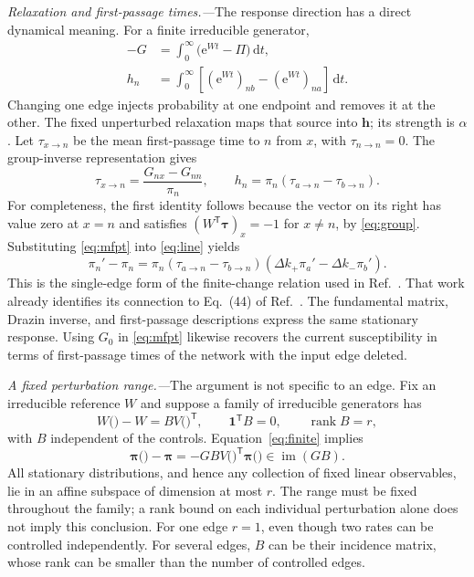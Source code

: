 \documentclass[
  reprint,
  superscriptaddress,
  amsmath,
  amssymb,
  aps,
  pre,
  longbibliography
]{revtex4-2}
\def\theta{}%
\newcommand{\me}{\mathrm{e}}
\newcommand{\dd}{\mathrm{d}}
\begin{document}
\textit{Relaxation and first-passage times.---}The response direction
has a direct dynamical meaning. For a finite irreducible generator,
\begin{equation}
 \begin{split}
 -G&=\int_0^\infty\!\bigl(\me^{Wt}-\Pi\bigr)\,\dd t,\\
 h_n&=\int_0^\infty\!\left[
 (\me^{Wt})_{nb}-(\me^{Wt})_{na}\right]\,\dd t.
 \end{split}
 \label{eq:relaxation}
\end{equation}
Changing one edge injects probability at one endpoint and removes it
at the other. The fixed unperturbed relaxation maps that source into
$\bm h$; its strength is $\alpha$.
Let $\tau_{x\to n}$ be the mean first-passage time to $n$ from $x$,
with $\tau_{n\to n}=0$. The group-inverse representation
\cite{Meyer1975} gives
\begin{equation}
 \tau_{x\to n}=\frac{G_{nx}-G_{nn}}{\pi_n},\qquad
 h_n=\pi_n(\tau_{a\to n}-\tau_{b\to n}).
 \label{eq:mfpt}
\end{equation}
For completeness, the first identity follows because the vector on its
right has value zero at $x=n$ and satisfies
$(W^{\mathsf T}\bm\tau)_x=-1$ for $x\ne n$, by \cref{eq:group}.
Substituting \cref{eq:mfpt} into \cref{eq:line} yields
\begin{equation}
 \pi_n'-\pi_n
 =\pi_n(\tau_{a\to n}-\tau_{b\to n})
       (\Delta k_+\pi_a'-\Delta k_-\pi_b').
 \label{eq:mfpt-response}
\end{equation}
This is the single-edge form of the finite-change relation used in
Ref.~\cite{Khodabandehlou2025}. That work already identifies its
connection to Eq.~(44) of Ref.~\cite{Harvey2023}. The fundamental
matrix, Drazin inverse, and first-passage descriptions express the same
stationary response. Using $G_0$ in \cref{eq:mfpt} likewise recovers
the current susceptibility in terms of first-passage times of the
network with the input edge deleted.

\textit{A fixed perturbation range.---}The argument is not specific to
an edge. Fix an irreducible reference $W$ and suppose a family of
irreducible generators has
\begin{equation}
 W(\bm\theta)-W=B V(\bm\theta)^{\mathsf T},\qquad
 \bm 1^{\mathsf T}B=0,\qquad \operatorname{rank}B=r,
 \label{eq:rankr}
\end{equation}
with $B$ independent of the controls. Equation~\eqref{eq:finite} implies
\begin{equation}
 \bm\pi(\bm\theta)-\bm\pi
 =-G B V(\bm\theta)^{\mathsf T}\bm\pi(\bm\theta)
 \in\operatorname{im}(GB).
 \label{eq:subspace}
\end{equation}
All stationary distributions, and hence any collection of fixed linear
observables, lie in an affine subspace of dimension at most $r$.
The range must be fixed throughout the family; a rank bound on each
individual perturbation alone does not imply this conclusion.
For one edge $r=1$, even though two rates can be controlled
independently. For several edges, $B$ can be their incidence matrix,
whose rank can be smaller than the number of controlled edges.
\end{document}
